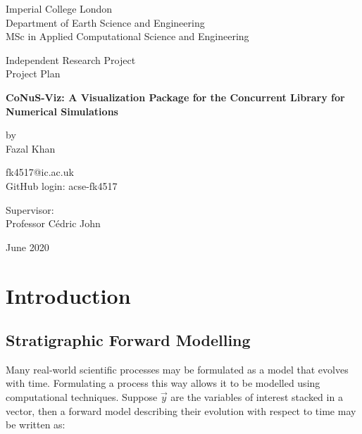 \documentclass[12pt]{article}
\begin{document}
\begin{titlepage}
	\begin{center}
		\vspace*{1cm}
		
		Imperial College London \\
		Department of Earth Science and Engineering \\
		MSc in Applied Computational Science and Engineering
		
		\vspace{1cm}
		
		Independent Research Project \\
		Project Plan
		
		
		\vspace{1cm}
		
		
		{\fontsize{18}{104}\selectfont \textbf{ CoNuS-Viz: A Visualization Package for the Concurrent Library for Numerical Simulations}}

		
		\vspace{1cm}
		
		by \\ 
		Fazal Khan
		
		\vspace{1.5cm}
		
		fk4517@ic.ac.uk \\
		
		GitHub login: acse-fk4517
		
		
		\vfill
		
		Supervisor: \\
		Professor Cédric John
		
		\vspace{2.0cm}
		
		June 2020
		
	\end{center}
\end{titlepage}	
\section{Introduction}

\subsection{Stratigraphic Forward Modelling}

Many real-world scientific processes may be formulated as a model that evolves with time. Formulating a process this way allows it to be modelled using computational techniques. Suppose $\vec y$ are the variables of interest stacked in a vector, then a forward model describing their evolution with respect to time may be written as:
\end{document}
